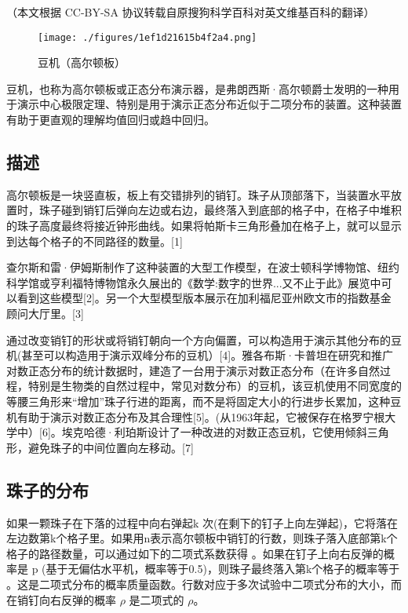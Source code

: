 
（本文根据 CC-BY-SA 协议转载自原搜狗科学百科对英文维基百科的翻译）

\begin{figure}[ht]
\centering
\texttt{[image: ./figures/1ef1d21615b4f2a4.png]}
\caption{豆机（高尔顿板）} \label{fig_GRDDB_1}
\end{figure}

豆机，也称为高尔顿板或正态分布演示器，是弗朗西斯·高尔顿爵士发明的一种用于演示中心极限定理、特别是用于演示正态分布近似于二项分布的装置。这种装置有助于更直观的理解均值回归或趋中回归。

\subsection{描述}

高尔顿板是一块竖直板，板上有交错排列的销钉。珠子从顶部落下，当装置水平放置时，珠子碰到销钉后弹向左边或右边，最终落入到底部的格子中，在格子中堆积的珠子高度最终将接近钟形曲线。如果将帕斯卡三角形叠加在格子上，就可以显示到达每个格子的不同路径的数量。[1]

查尔斯和雷·伊姆斯制作了这种装置的大型工作模型，在波士顿科学博物馆、纽约科学馆或亨利福特博物馆永久展出的《数学:数字的世界...又不止于此》展览中可以看到这些模型[2]。另一个大型模型版本展示在加利福尼亚州欧文市的指数基金顾问大厅里。[3]

通过改变销钉的形状或将销钉朝向一个方向偏置，可以构造用于演示其他分布的豆机(甚至可以构造用于演示双峰分布的豆机）[4]。雅各布斯·卡普坦在研究和推广对数正态分布的统计数据时，建造了一台用于演示对数正态分布（在许多自然过程，特别是生物类的自然过程中，常见对数分布）的豆机，该豆机使用不同宽度的等腰三角形来“增加”珠子行进的距离，而不是将固定大小的行进步长累加，这种豆机有助于演示对数正态分布及其合理性[5]。(从1963年起，它被保存在格罗宁根大学中）[6]。埃克哈德·利珀斯设计了一种改进的对数正态豆机，它使用倾斜三角形，避免珠子的中间位置向左移动。[7]

\subsection{珠子的分布}

如果一颗珠子在下落的过程中向右弹起k 次(在剩下的钉子上向左弹起)，它将落在左边数第k个格子里。如果用n表示高尔顿板中销钉的行数，则珠子落入底部第k个格子的路径数量，可以通过如下的二项式系数获得   。如果在钉子上向右反弹的概率是 p (基于无偏估水平机，概率等于0.5)，则珠子最终落入第k个格子的概率等于   。这是二项式分布的概率质量函数。行数对应于多次试验中二项式分布的大小，而在销钉向右反弹的概率 $\rho$ 是二项式的 $\rho$。

